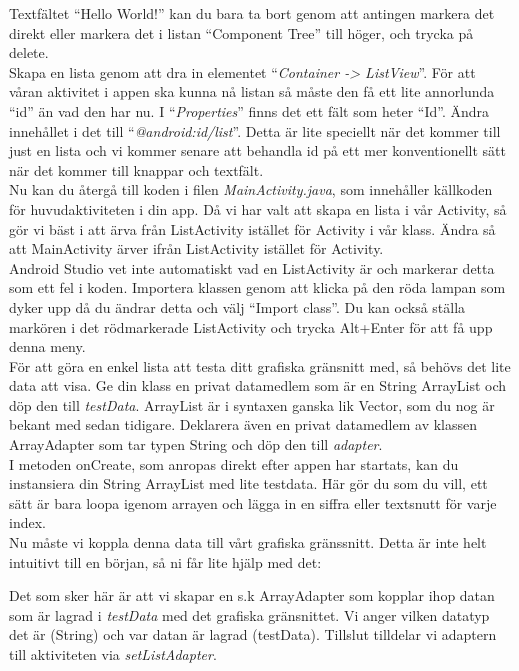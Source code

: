 \documentclass[11 pt, titlepage]{article} %
\begin{document}
Textfältet “Hello World!” kan du bara ta bort genom att antingen markera det direkt eller markera det i listan “Component Tree” till höger, och trycka på delete.\\

Skapa en lista genom att dra in elementet “\textit{Container -> ListView}”.
För att våran aktivitet i appen ska kunna nå listan så måste den få ett lite annorlunda “id” än vad den har nu.
I “\textit{Properties}” finns det ett fält som heter “Id”.
Ändra innehållet i det till “\textit{@android:id/list}”.
Detta är lite speciellt när det kommer till just en lista och vi kommer senare att behandla id på ett mer konventionellt sätt när det kommer till knappar och textfält.\\

Nu kan du återgå till koden i filen \textit{MainActivity.java}, som innehåller källkoden för huvudaktiviteten i din app.
Då vi har valt att skapa en lista i vår Activity, så gör vi bäst i att ärva från ListActivity istället för Activity i vår klass.
Ändra så att MainActivity ärver ifrån ListActivity istället för Activity. \\

Android Studio vet inte automatiskt vad en ListActivity är och markerar detta som ett fel i koden.
Importera klassen genom att klicka på den röda lampan som dyker upp då du ändrar detta och välj “Import class”.
Du kan också ställa markören i det rödmarkerade ListActivity och trycka Alt+Enter för att få upp denna meny. \\ %

För att göra en enkel lista att testa ditt grafiska gränsnitt med, så behövs det lite data att visa.
Ge din klass en privat datamedlem som är en String ArrayList och döp den till \textit{testData}.
ArrayList är i syntaxen ganska lik Vector, som du nog är bekant med sedan tidigare.
Deklarera även en privat datamedlem av klassen ArrayAdapter som tar typen String och döp den till \textit{adapter}.\\

I metoden onCreate, som anropas direkt efter appen har startats, kan du instansiera din String ArrayList med lite testdata.
Här gör du som du vill, ett sätt är bara loopa igenom arrayen och lägga in en siffra eller textsnutt för varje index.\\

Nu måste vi koppla denna data till vårt grafiska gränssnitt. Detta är inte helt intuitivt till en början, så ni får lite hjälp med det:

Det som sker här är att vi skapar en s.k ArrayAdapter som kopplar ihop datan som är lagrad i \textit{testData} med det grafiska gränsnittet.
Vi anger vilken datatyp det är (String) och var datan är lagrad (testData).
Tillslut tilldelar vi adaptern till aktiviteten via \textit{setListAdapter}.\\
\end{document}
